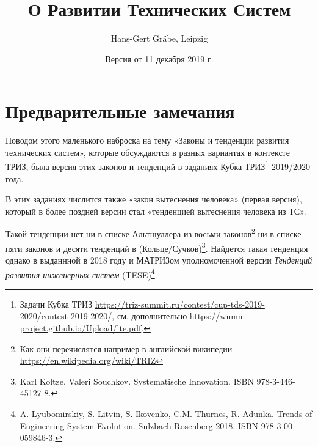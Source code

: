 \documentclass[11pt,a4paper]{article}
\title{О Развитии Технических Систем}
\author{Hans-Gert Gräbe, Leipzig}
\date{Версия от 11 декабря 2019 г.}
\begin{document}
\maketitle

\section{Предварительные замечания}

Поводом этого маленького наброска на тему «Законы и тенденции развития
технических систем», которые обсуждаются в разных вариантах в контексте ТРИЗ,
была версия этих законов и тенденций в заданиях Кубка
ТРИЗ\footnote{\raggedright Задачи Кубка ТРИЗ
  \url{https://triz-summit.ru/contest/cup-tds-2019-2020/contest-2019-2020/},
  см. дополнительно \url{https://wumm-project.github.io/Upload/lte.pdf}. }
2019/2020 года.

В этих заданиях числится также «закон вытеснения человека» (первая версия),
который в более поздней версии стал «тенденцией вытеснения человека из ТС».

Такой тенденции нет ни в списке Альтшуллера из восьми законов\footnote{Как они
  перечислятся например в английской википедии
  \url{https://en.wikipedia.org/wiki/TRIZ}} ни в списке пяти законов и десяти
тенденций в (Кольце/Сучков)\footnote{Karl Koltze, Valeri Souchkov.
  Systematische Innovation. ISBN 978-3-446-45127-8.}. Найдется такая тенденция
однако в выданнной в 2018 году и МАТРИЗом уполномоченной версии \emph{Тенденций
  развития инженерных систем} (TESE)\footnote{A. Lyubomirskiy, S. Litvin,
  S. Ikovenko, C.M. Thurnes, R. Adunka. Trends of Engineering System
  Evolution. Sulzbach-Rosenberg 2018.  ISBN 978-3-00-059846-3.}.
\end{document}
